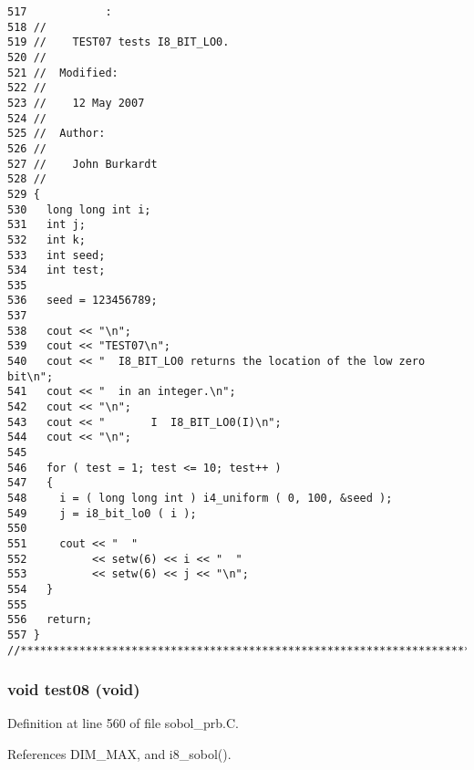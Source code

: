 \begin{Code}\begin{verbatim}517            :
518 //
519 //    TEST07 tests I8_BIT_LO0.
520 //
521 //  Modified:
522 //
523 //    12 May 2007
524 //
525 //  Author:
526 //
527 //    John Burkardt
528 //
529 {
530   long long int i;
531   int j;
532   int k;
533   int seed;
534   int test;
535 
536   seed = 123456789;
537 
538   cout << "\n";
539   cout << "TEST07\n";
540   cout << "  I8_BIT_LO0 returns the location of the low zero bit\n";
541   cout << "  in an integer.\n";
542   cout << "\n";
543   cout << "       I  I8_BIT_LO0(I)\n";
544   cout << "\n";
545 
546   for ( test = 1; test <= 10; test++ )
547   {
548     i = ( long long int ) i4_uniform ( 0, 100, &seed );
549     j = i8_bit_lo0 ( i );
550 
551     cout << "  "
552          << setw(6) << i << "  "
553          << setw(6) << j << "\n";
554   }
555 
556   return;
557 }
//****************************************************************************80
\end{verbatim}
\end{Code}


\subsubsection{\setlength{\rightskip}{0pt plus 5cm}void test08 (void)}\label{sobol__prb_8C_32017d74053b26ec7a261902632c6c08}




Definition at line 560 of file sobol\_\-prb.C.

References DIM\_\-MAX, and i8\_\-sobol().

